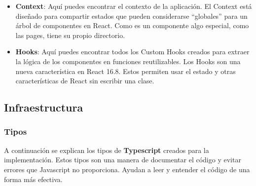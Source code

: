 \documentclass[12pt,twoside,titlepage]{report}
\begin{document}
\begin{itemize}
    \item \textbf{Context}: Aquí puedes encontrar el contexto de la aplicación. El Context está diseñado para compartir estados que pueden considerarse “globales” para un árbol de componentes en React. Como es un componente algo especial, como las pages, tiene su propio directorio.
    \item \textbf{Hooks}: Aquí puedes encontrar todos los Custom Hooks creados para extraer la lógica de los componentes en funciones reutilizables. Los Hooks son una nueva característica en React 16.8. Estos permiten usar el estado y otras características de React sin escribir una clase.
\end{itemize}

\subsection{Infraestructura}

\subsubsection{Tipos}

A continuación se explican los tipos de \textbf{Typescript} creados para la implementación. Estos tipos son una manera de documentar el código y evitar errores que Javascript no proporciona. Ayudan a leer y entender el código de una forma más efectiva.
\end{document}
